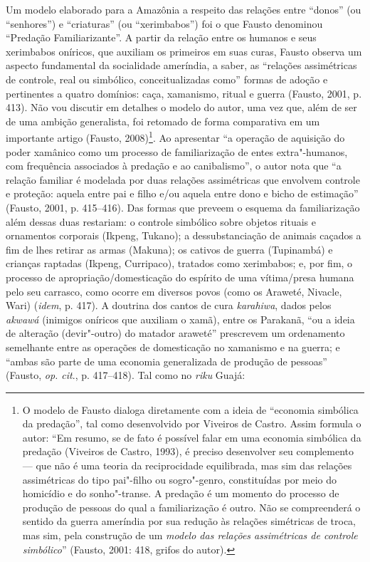 Um modelo elaborado para a Amazônia a respeito das relações entre
``donos'' (ou ``senhores'') e ``criaturas'' (ou ``xerimbabos'') foi o que Fausto
denominou ``Predação Familiarizante''. A partir da relação entre os
humanos e seus xerimbabos oníricos, que auxiliam os primeiros em suas
curas, Fausto observa um aspecto fundamental da socialidade ameríndia, a
saber, as ``relações assimétricas de controle, real ou simbólico,
conceitualizadas como'' formas de adoção e pertinentes a quatro domínios:
caça, xamanismo, ritual e guerra (Fausto, 2001, p. 413). Não vou
discutir em detalhes o modelo do autor, uma vez que, além de ser de uma
ambição generalista, foi retomado de forma comparativa em um importante
artigo (Fausto, 2008)\footnote{O modelo de Fausto dialoga diretamente
  com a ideia de ``economia simbólica da predação'', tal como desenvolvido
  por Viveiros de Castro. Assim formula o autor: ``Em resumo, se de fato
      é possível falar em uma economia simbólica da predação (Viveiros de
      Castro, 1993), é preciso desenvolver seu complemento --- que não é uma
      teoria da reciprocidade equilibrada, mas sim das relações assimétricas
      do tipo pai"-filho ou sogro"-genro, constituídas por meio do homicídio e
      do sonho"-transe. A predação é um momento do processo de produção de
      pessoas do qual a familiarização é outro. Não se compreenderá o
      sentido da guerra ameríndia por sua redução às relações simétricas de
      troca, mas sim, pela construção de um \emph{modelo das relações
      assimétricas de controle simbólico}'' (Fausto, 2001: 418, grifos do
  autor).}. Ao apresentar ``a operação de aquisição do poder xamânico
    como um processo de familiarização de entes extra"-humanos, com
    frequência associados à predação e ao canibalismo'', o autor nota que ``a
        relação familiar é modelada por duas relações assimétricas que envolvem
        controle e proteção: aquela entre pai e filho e/ou aquela entre dono e
        bicho de estimação'' (Fausto, 2001, p. 415--416). Das formas que preveem o
esquema da familiarização além dessas duas restariam: o controle
simbólico sobre objetos rituais e ornamentos corporais (Ikpeng, Tukano);
a dessubstanciação de animais caçados a fim de lhes retirar as armas
(Makuna); os cativos de guerra (Tupinambá) e crianças raptadas (Ikpeng,
Curripaco), tratados como xerimbabos; e, por fim, o processo de
apropriação/domesticação do espírito de uma vítima/presa humana pelo seu
carrasco, como ocorre em diversos povos (como os Araweté, Nivacle, Wari)
(\emph{idem}, p. 417). A doutrina dos cantos de cura \emph{karahiwa}, dados
pelos \emph{akwawá} (inimigos oníricos que auxiliam o xamã), entre os
Parakanã, ``ou a ideia de alteração (devir"-outro) do matador araweté''
prescrevem um ordenamento semelhante entre as operações de domesticação
no xamanismo e na guerra; e ``ambas são parte de uma economia
generalizada de produção de pessoas'' (Fausto, \emph{op. cit}., p. 417--418). Tal
como no \emph{riku} Guajá:

